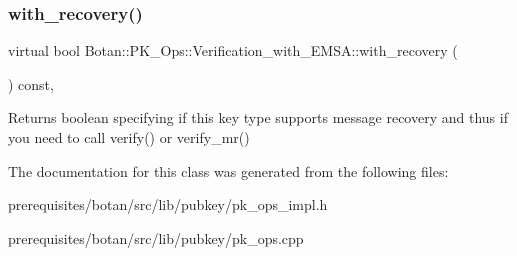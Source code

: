 \mbox{\label{class_botan_1_1_p_k___ops_1_1_verification__with___e_m_s_a_a75ab60a7d1bc3a457df0e881edad5af4}} 
\subsubsection{\texorpdfstring{with\+\_\+recovery()}{with\_recovery()}}
{\footnotesize\ttfamily virtual bool Botan\+::\+P\+K\+\_\+\+Ops\+::\+Verification\+\_\+with\+\_\+\+E\+M\+S\+A\+::with\+\_\+recovery (\begin{DoxyParamCaption}{ }\end{DoxyParamCaption}) const\hspace{0.3cm}{\ttfamily [protected]}, {}}

\begin{DoxyReturn}{Returns}
boolean specifying if this key type supports message recovery and thus if you need to call verify() or verify\+\_\+mr() 
\end{DoxyReturn}


The documentation for this class was generated from the following files\+:\begin{DoxyCompactItemize}
\item 
prerequisites/botan/src/lib/pubkey/pk\+\_\+ops\+\_\+impl.\+h\item 
prerequisites/botan/src/lib/pubkey/pk\+\_\+ops.\+cpp\end{DoxyCompactItemize}

